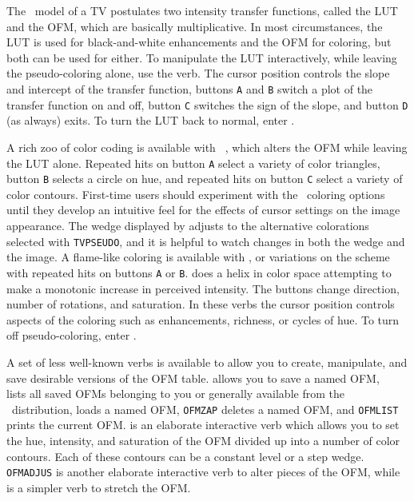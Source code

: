 
     The \AIPS\ model of a TV postulates two intensity transfer
functions, called the LUT and the OFM, which are basically
multiplicative.  In most circumstances, the LUT is used for
black-and-white enhancements and the OFM for coloring, but both can be
used for either.  To manipulate the LUT interactively, while leaving
the pseudo-coloring alone, use the {\tt {}} verb.  The
cursor position controls the slope and intercept of the transfer
function, buttons {\tt A} and {\tt B} switch a plot of the transfer
function on and off, button {\tt C} switches the sign of the slope,
and button {\tt D} (as always) exits.  To turn the LUT back to normal,
enter {\tt {}}\@.

     A rich zoo of color coding is available with {\tt
{}}, which alters the OFM while leaving the LUT alone.
Repeated hits on button {\tt A} select a variety of color triangles,
button {\tt B} selects a circle on hue, and repeated hits on button
{\tt C} select a variety of color contours.  First-time users should
experiment with the \AIPS\ coloring options until they develop an
intuitive feel for the effects of cursor settings on the image
appearance.  The wedge displayed by {\tt {}} adjusts to the
alternative colorations selected with {\tt TVPSEUDO}, and it is
helpful to watch changes in both the wedge and the image.  A
flame-like coloring is available with {\tt {}}, or
variations on the scheme with repeated hits on buttons {\tt A} or
{\tt B}\@.  {\tt {}} does a helix in color space
attempting to make a monotonic increase in perceived intensity.  The
buttons change direction, number of rotations, and saturation.
In these verbs the cursor position controls aspects of the coloring
such as enhancements, richness, or cycles of hue.  To turn off
pseudo-coloring, enter {\tt {}}\@.

     A set of less well-known verbs is available to allow you to
create, manipulate, and save desirable versions of the OFM table.
{\tt {}} allows you to save a named OFM, {\tt
{}} lists all saved OFMs belonging to you or generally
available from the \AIPS\ distribution, {\tt {}} loads a
named OFM, {\tt OFMZAP} deletes a named OFM, and {\tt OFMLIST} prints
the current OFM\@.  {\tt {}} is an elaborate interactive
verb which allows you to set the hue, intensity, and saturation of the
OFM divided up into a number of color contours. Each of these contours
can be a constant level or a step wedge.  {\tt OFMADJUS} is another
elaborate interactive verb to alter pieces of the OFM, while {\tt
{}} is a simpler verb to stretch the OFM\@.

